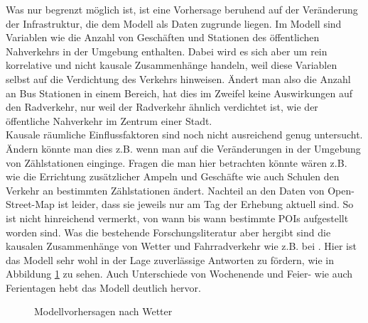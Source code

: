 \documentclass[a4paper,12pt]{thesis}
\begin{document}
Was nur begrenzt möglich ist, ist eine Vorhersage beruhend auf der Veränderung der Infrastruktur, die dem Modell als Daten zugrunde liegen. Im Modell sind Variablen wie die Anzahl von Geschäften und Stationen des öffentlichen Nahverkehrs in der Umgebung enthalten. Dabei wird es sich aber um rein korrelative und nicht kausale Zusammenhänge handeln, weil diese Variablen selbst auf die Verdichtung des Verkehrs hinweisen. Ändert man also die Anzahl an Bus Stationen in einem Bereich, hat dies im Zweifel keine Auswirkungen auf den Radverkehr, nur  weil der Radverkehr ähnlich verdichtet ist, wie der öffentliche Nahverkehr im Zentrum einer Stadt.\\
Kausale räumliche Einflussfaktoren sind noch nicht ausreichend genug untersucht. Ändern könnte man dies z.B. wenn man auf die Veränderungen in der Umgebung von Zählstationen einginge. Fragen die man hier betrachten könnte wären z.B. wie die Errichtung zusätzlicher Ampeln und Geschäfte wie auch Schulen den Verkehr an bestimmten Zählstationen ändert. Nachteil an den Daten von Open-Street-Map ist leider, dass sie jeweils nur am Tag der Erhebung aktuell sind. So ist nicht hinreichend vermerkt, von wann bis wann bestimmte POIs aufgestellt worden sind. Was die bestehende Forschungsliteratur aber hergibt sind die kausalen Zusammenhänge von Wetter und Fahrradverkehr wie z.B. bei \cite{Wessel2020}. Hier ist das Modell sehr wohl in der Lage zuverlässige Antworten zu fördern, wie in Abbildung \ref{fig:Temperaturunterschied} zu sehen. Auch Unterschiede von Wochenende und Feier- wie auch Ferientagen hebt das Modell deutlich hervor.

\begin{figure}%
	\centering
	
	\caption{Modellvorhersagen nach Wetter}%
	\label{fig:Temperaturunterschied}%
\end{figure}
\end{document}
